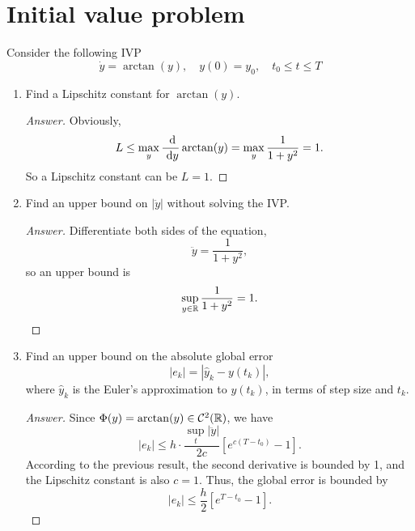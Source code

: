 \section{Initial value problem}
Consider the following IVP
\[ \dot{y} = \arctan(y), \quad y(0) = y_0, \quad t_0\leq t\leq T \]
\begin{enumerate}
	\item Find a Lipschitz constant for \(\arctan(y)\).
	\begin{proof}[Answer]
	Obviously,
	\[ L\leq\max_{y}\frac{~\mathrm{d}}{~\mathrm{d} y}\arctan(y)=\max_{y}\frac{1}{1+y^2}=1. \]
	So a Lipschitz constant can be \(L=1\).
	\end{proof}
	\item Find an upper bound on \(|\ddot{y}|\) without solving the IVP.
	\begin{proof}[Answer]
	Differentiate both sides of the equation,
	\[ \ddot{y}=\frac{1}{1+y^2}, \]
	so an upper bound is
	\[ \sup_{y\in\mathbb{R}}\frac{1}{1+y^2}=1. \]
	\end{proof}
	\item Find an upper bound on the absolute global error
	\[ |e_k|=|\hat{y}_k-y(t_k)|, \]
	where \(\hat{y}_k\) is the Euler's approximation to \(y(t_k)\), in terms of step size and \(t_k\).
	\begin{proof}[Answer]
	Since \(\Phi(y)=\arctan(y)\in\mathcal{C}^2(\mathbb{R})\), we have
	\[ |e_k|\leq h\cdot\frac{\sup_{t}|\ddot{y}|}{2c}\left[e^{c(T-t_0)}-1 \right]. \]
	According to the previous result, the second derivative is bounded by 1, and the Lipschitz constant is also \(c=1\).
	Thus, the global error is bounded by
	\[ |e_k|\leq \frac{h}{2}\left[e^{T-t_0}-1 \right]. \]
	\end{proof}
\end{enumerate}



